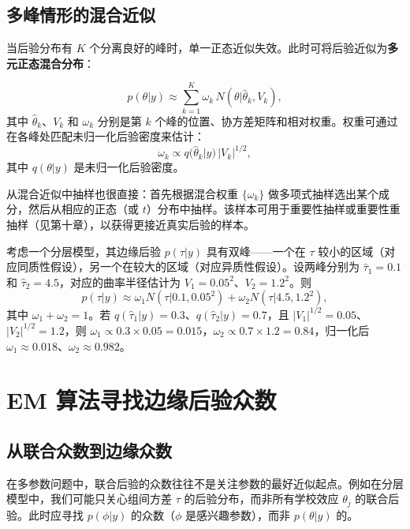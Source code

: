 \subsection{多峰情形的混合近似}\label{sec:mixture-approx}

当后验分布有 $K$ 个分离良好的峰时，单一正态近似失效。此时可将后验近似为\textbf{多元正态混合分布}：

\begin{equation}\label{eq:normal-mixture}
p(\theta|y) \approx \sum_{k=1}^K \omega_k \, N(\theta | \hat{\theta}_k, V_k),
\end{equation}
其中 $\hat{\theta}_k$、$V_k$ 和 $\omega_k$ 分别是第 $k$ 个峰的位置、协方差矩阵和相对权重。权重可通过在各峰处匹配未归一化后验密度来估计：
\[
\omega_k \propto q(\hat{\theta}_k|y) \, |V_k|^{1/2},
\]
其中 $q(\theta|y)$ 是未归一化后验密度。

从混合近似中抽样也很直接：首先根据混合权重 $\{\omega_k\}$ 做多项式抽样选出某个成分，然后从相应的正态（或 $t$）分布中抽样。该样本可用于重要性抽样或重要性重抽样（见第十章），以获得更接近真实后验的样本。

\begin{Example}[双峰后验的混合近似]\label{ex:bimodal-mixture}
考虑一个分层模型，其边缘后验 $p(\tau|y)$ 具有双峰——一个在 $\tau$ 较小的区域（对应同质性假设），另一个在较大的区域（对应异质性假设）。设两峰分别为 $\hat{\tau}_1 = 0.1$ 和 $\hat{\tau}_2 = 4.5$，对应的曲率半径估计为 $V_1 = 0.05^2$、$V_2 = 1.2^2$。则
\[
p(\tau|y) \approx \omega_1 N(\tau | 0.1, 0.05^2) + \omega_2 N(\tau | 4.5, 1.2^2),
\]
其中 $\omega_1 + \omega_2 = 1$。若 $q(\hat{\tau}_1|y) = 0.3$、$q(\hat{\tau}_2|y) = 0.7$，且 $|V_1|^{1/2} = 0.05$、$|V_2|^{1/2} = 1.2$，则 $\omega_1 \propto 0.3 \times 0.05 = 0.015$，$\omega_2 \propto 0.7 \times 1.2 = 0.84$，归一化后 $\omega_1 \approx 0.018$、$\omega_2 \approx 0.982$。
\end{Example}

\section{EM 算法寻找边缘后验众数}\label{sec:em-algorithm}

\subsection{从联合众数到边缘众数}\label{sec:joint-to-marginal}

在多参数问题中，联合后验的众数往往不是关注参数的最好近似起点。例如在分层模型中，我们可能只关心组间方差 $\tau$ 的后验分布，而非所有学校效应 $\theta_j$ 的联合后验。此时应寻找 $p(\phi|y)$ 的众数（$\phi$ 是感兴趣参数），而非 $p(\theta|y)$ 的。

